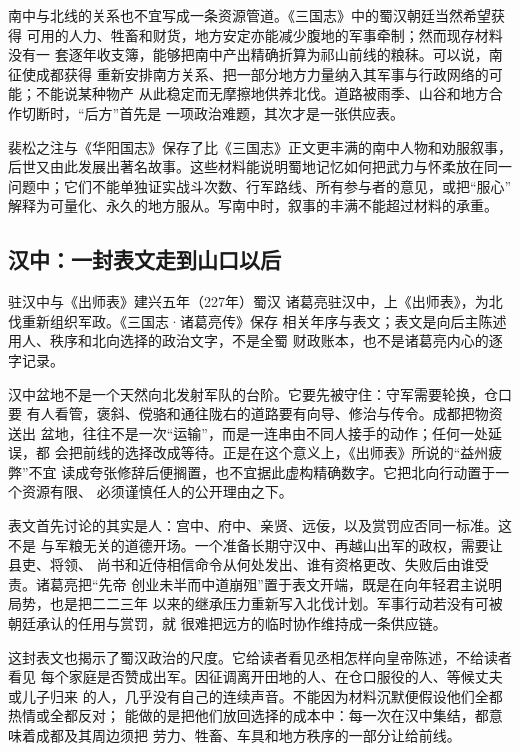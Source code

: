 南中与北线的关系也不宜写成一条资源管道。《三国志》中的蜀汉朝廷当然希望获得
可用的人力、牲畜和财货，地方安定亦能减少腹地的军事牵制；然而现存材料没有一
套逐年收支簿，能够把南中产出精确折算为祁山前线的粮秣。可以说，南征使成都获得
重新安排南方关系、把一部分地方力量纳入其军事与行政网络的可能；不能说某种物产
从此稳定而无摩擦地供养北伐。道路被雨季、山谷和地方合作切断时，“后方”首先是
一项政治难题，其次才是一张供应表。

\begin{sourcenote}
裴松之注与《华阳国志》保存了比《三国志》正文更丰满的南中人物和劝服叙事，
后世又由此发展出著名故事。这些材料能说明蜀地记忆如何把武力与怀柔放在同一
问题中；它们不能单独证实战斗次数、行军路线、所有参与者的意见，或把“服心”
解释为可量化、永久的地方服从。写南中时，叙事的丰满不能超过材料的承重。
\end{sourcenote}

\subsection{汉中：一封表文走到山口以后}

\begin{event}{驻汉中与《出师表》}{建兴五年（227年）}{蜀汉}{}
诸葛亮驻汉中，上《出师表》，为北伐重新组织军政。《三国志·诸葛亮传》保存
相关年序与表文；表文是向后主陈述用人、秩序和北向选择的政治文字，不是全蜀
财政账本，也不是诸葛亮内心的逐字记录。
\end{event}

汉中盆地不是一个天然向北发射军队的台阶。它要先被守住：守军需要轮换，仓口要
有人看管，褒斜、傥骆和通往陇右的道路要有向导、修治与传令。成都把物资送出
盆地，往往不是一次“运输”，而是一连串由不同人接手的动作；任何一处延误，都
会把前线的选择改成等待。正是在这个意义上，《出师表》所说的“益州疲弊”不宜
读成夸张修辞后便搁置，也不宜据此虚构精确数字。它把北向行动置于一个资源有限、
必须谨慎任人的公开理由之下。

表文首先讨论的其实是人：宫中、府中、亲贤、远佞，以及赏罚应否同一标准。这不是
与军粮无关的道德开场。一个准备长期守汉中、再越山出军的政权，需要让县吏、将领、
尚书和近侍相信命令从何处发出、谁有资格更改、失败后由谁受责。诸葛亮把“先帝
创业未半而中道崩殂”置于表文开端，既是在向年轻君主说明局势，也是把二二三年
以来的继承压力重新写入北伐计划。军事行动若没有可被朝廷承认的任用与赏罚，就
很难把远方的临时协作维持成一条供应链。

这封表文也揭示了蜀汉政治的尺度。它给读者看见丞相怎样向皇帝陈述，不给读者看见
每个家庭是否赞成出军。因征调离开田地的人、在仓口服役的人、等候丈夫或儿子归来
的人，几乎没有自己的连续声音。不能因为材料沉默便假设他们全都热情或全都反对；
能做的是把他们放回选择的成本中：每一次在汉中集结，都意味着成都及其周边须把
劳力、牲畜、车具和地方秩序的一部分让给前线。

